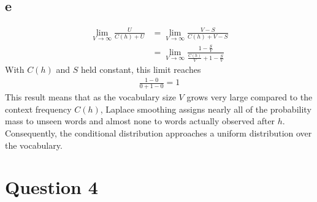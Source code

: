 \documentclass{article}
\numberwithin{equation}{section}
\begin{document}
    \subsection*{e}
    \begin{align*}
        \lim_{V \to \infty} \frac{U}{C(h) + U} &= \lim_{V \to \infty} \frac{V - S}{C(h) + V - S} \\
            &= \lim_{V \to \infty} \frac{1 - \frac{S}{V}}{\frac{C(h)}{V} + 1 - \frac{S}{V}}
    \end{align*}
    With $C(h)$ and $S$ held constant, this limit reaches
    \begin{align*}
        \frac{1 - 0}{0 + 1 - 0} = 1
    \end{align*}
    This result means that as the vocabulary size $V$ grows very large compared to the context frequency $C(h)$, Laplace smoothing assigns nearly all of the probability mass  to unseen words and almost none  to words actually observed after $h$.
    Consequently, the conditional distribution approaches a uniform distribution over the vocabulary.


    \section*{Question 4}
\end{document}
